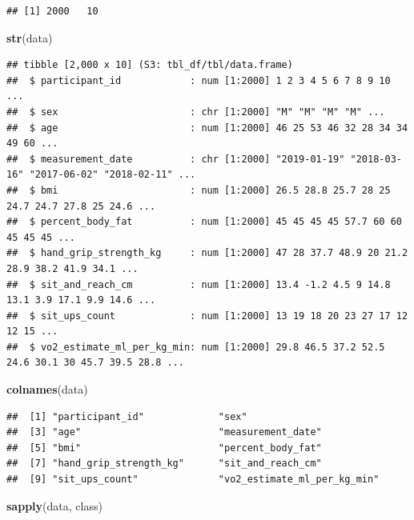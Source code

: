 \documentclass[
]{article}
\newenvironment{Shaded}{\begin{snugshade}}{\end{snugshade}}
\newcommand{\FunctionTok}[1]{\textcolor[rgb]{0.13,0.29,0.53}{\textbf{#1}}}
\newcommand{\NormalTok}[1]{#1}
\begin{document}
\begin{verbatim}
## [1] 2000   10
\end{verbatim}

\begin{Shaded}
\begin{Highlighting}[]
\FunctionTok{str}\NormalTok{(data)}
\end{Highlighting}
\end{Shaded}

\begin{verbatim}
## tibble [2,000 x 10] (S3: tbl_df/tbl/data.frame)
##  $ participant_id            : num [1:2000] 1 2 3 4 5 6 7 8 9 10 ...
##  $ sex                       : chr [1:2000] "M" "M" "M" "M" ...
##  $ age                       : num [1:2000] 46 25 53 46 32 28 34 34 49 60 ...
##  $ measurement_date          : chr [1:2000] "2019-01-19" "2018-03-16" "2017-06-02" "2018-02-11" ...
##  $ bmi                       : num [1:2000] 26.5 28.8 25.7 28 25 24.7 24.7 27.8 25 24.6 ...
##  $ percent_body_fat          : num [1:2000] 45 45 45 45 57.7 60 60 45 45 45 ...
##  $ hand_grip_strength_kg     : num [1:2000] 47 28 37.7 48.9 20 21.2 28.9 38.2 41.9 34.1 ...
##  $ sit_and_reach_cm          : num [1:2000] 13.4 -1.2 4.5 9 14.8 13.1 3.9 17.1 9.9 14.6 ...
##  $ sit_ups_count             : num [1:2000] 13 19 18 20 23 27 17 12 12 15 ...
##  $ vo2_estimate_ml_per_kg_min: num [1:2000] 29.8 46.5 37.2 52.5 24.6 30.1 30 45.7 39.5 28.8 ...
\end{verbatim}

\begin{Shaded}
\begin{Highlighting}[]
\FunctionTok{colnames}\NormalTok{(data)}
\end{Highlighting}
\end{Shaded}

\begin{verbatim}
##  [1] "participant_id"             "sex"                       
##  [3] "age"                        "measurement_date"          
##  [5] "bmi"                        "percent_body_fat"          
##  [7] "hand_grip_strength_kg"      "sit_and_reach_cm"          
##  [9] "sit_ups_count"              "vo2_estimate_ml_per_kg_min"
\end{verbatim}

\begin{Shaded}
\begin{Highlighting}[]
\FunctionTok{sapply}\NormalTok{(data, class)}
\end{Highlighting}
\end{Shaded}
\end{document}
